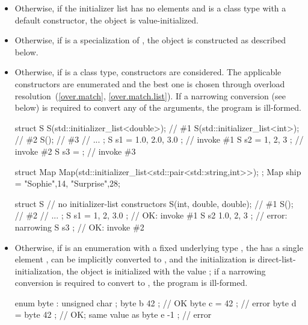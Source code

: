 \begin{itemize}
\item Otherwise, if the initializer list has no elements and  is a class type with a
default constructor, the object is value-initialized.

\item Otherwise, if  is a specialization of ,
the object is constructed as described below.

\item Otherwise, if  is a class type, constructors are considered.
The applicable constructors are enumerated and
the best one is chosen through overload resolution~(\ref{over.match}, \ref{over.match.list}). If a narrowing
conversion (see below) is required to convert any of the arguments, the program is
ill-formed.

\begin{example}
\begin{codeblock}
struct S {
  S(std::initializer_list<double>); // \#1
  S(std::initializer_list<int>);    // \#2
  S();                              // \#3
  // ...
};
S s1 = { 1.0, 2.0, 3.0 };           // invoke \#1
S s2 = { 1, 2, 3 };                 // invoke \#2
S s3 = { };                         // invoke \#3
\end{codeblock}
\end{example}

\begin{example}
\begin{codeblock}
struct Map {
  Map(std::initializer_list<std::pair<std::string,int>>);
};
Map ship = {{"Sophie",14}, {"Surprise",28}};
\end{codeblock}
\end{example}

\begin{example}
\begin{codeblock}
struct S {
  // no initializer-list constructors
  S(int, double, double);           // \#1
  S();                              // \#2
  // ...
};
S s1 = { 1, 2, 3.0 };               // OK: invoke \#1
S s2 { 1.0, 2, 3 };                 // error: narrowing
S s3 { };                           // OK: invoke \#2
\end{codeblock}
\end{example}

\item Otherwise, if  is an enumeration
with a fixed underlying type ,
the  has a single element ,
 can be implicitly converted to , and
the initialization is direct-list-initialization,
the object is initialized with the value ;
if a narrowing conversion is required to convert 
to , the program is ill-formed.
\begin{example}
\begin{codeblock}
enum byte : unsigned char { };
byte b { 42 };                      // OK
byte c = { 42 };                    // error
byte d = byte{ 42 };                // OK; same value as 
byte e { -1 };                      // error


\end{codeblock}
\end{example}
\end{itemize}
